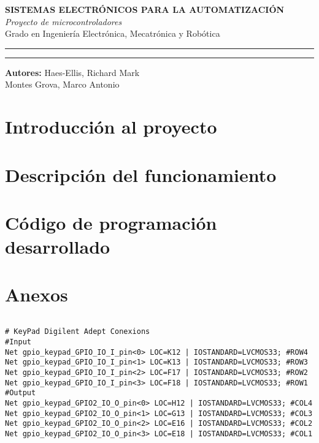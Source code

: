 \documentclass[a4paper,twoside]{article}
\begin{document}
\begin{titlepage}
	\centering
\Huge{\textbf{SISTEMAS ELECTRÓNICOS PARA LA AUTOMATIZACIÓN}} \\
\Huge{\textit{Proyecto de microcontroladores}}\\

\vspace{1cm}
\LARGE{Grado en Ingeniería Electrónica, Mecatrónica y Robótica}\\
\rule{\textwidth}{0.1mm}

\vspace{2cm}
\rule{\textwidth}{0.1mm}
\Large{\textbf{Autores:} Haes-Ellis, Richard Mark\\
			Montes Grova, Marco Antonio}
\end{titlepage}
\tableofcontents
\newpage

\section{Introducción al proyecto}
\section{Descripción del funcionamiento}
\section{Código de programación desarrollado}
\section{Anexos}
\newpage

\begin{lstlisting}[language=C,style=CStyle, caption={Declaración e inicialización de variables}]

\end{lstlisting}

\begin{verbatim}
# KeyPad Digilent Adept Conexions
#Input
Net gpio_keypad_GPIO_IO_I_pin<0> LOC=K12 | IOSTANDARD=LVCMOS33; #ROW4
Net gpio_keypad_GPIO_IO_I_pin<1> LOC=K13 | IOSTANDARD=LVCMOS33; #ROW3
Net gpio_keypad_GPIO_IO_I_pin<2> LOC=F17 | IOSTANDARD=LVCMOS33; #ROW2
Net gpio_keypad_GPIO_IO_I_pin<3> LOC=F18 | IOSTANDARD=LVCMOS33; #ROW1
#Output
Net gpio_keypad_GPIO2_IO_O_pin<0> LOC=H12 | IOSTANDARD=LVCMOS33; #COL4
Net gpio_keypad_GPIO2_IO_O_pin<1> LOC=G13 | IOSTANDARD=LVCMOS33; #COL3
Net gpio_keypad_GPIO2_IO_O_pin<2> LOC=E16 | IOSTANDARD=LVCMOS33; #COL2
Net gpio_keypad_GPIO2_IO_O_pin<3> LOC=E18 | IOSTANDARD=LVCMOS33; #COL1
\end{verbatim}
\end{document}
